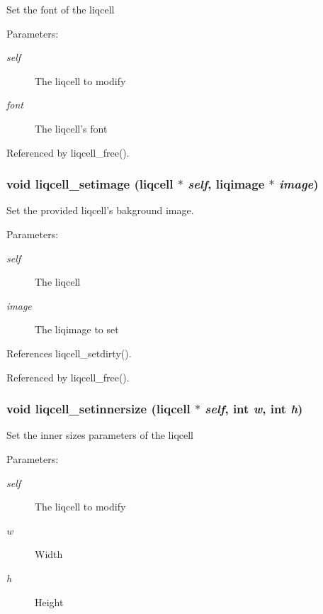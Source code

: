Set the font of the liqcell \begin{Desc}
\item[Parameters:]
\begin{description}
\item[{\em self}]The liqcell to modify \item[{\em font}]The liqcell's font \end{description}
\end{Desc}


Referenced by liqcell\_\-free().
\subsubsection[{liqcell\_\-setimage}]{\setlength{\rightskip}{0pt plus 5cm}void liqcell\_\-setimage (liqcell $\ast$ {\em self}, \/  liqimage $\ast$ {\em image})}\label{d5/da2/liqcell_8c_972de10bca2d1bd4192f4225dd04fb2c}


Set the provided liqcell's bakground image. \begin{Desc}
\item[Parameters:]
\begin{description}
\item[{\em self}]The liqcell \item[{\em image}]The liqimage to set \end{description}
\end{Desc}


References liqcell\_\-setdirty().

Referenced by liqcell\_\-free().
\subsubsection[{liqcell\_\-setinnersize}]{\setlength{\rightskip}{0pt plus 5cm}void liqcell\_\-setinnersize (liqcell $\ast$ {\em self}, \/  int {\em w}, \/  int {\em h})}\label{d5/da2/liqcell_8c_52eafc75b1cd53384992a37258bd22b4}


Set the inner sizes parameters of the liqcell \begin{Desc}
\item[Parameters:]
\begin{description}
\item[{\em self}]The liqcell to modify \item[{\em w}]Width \item[{\em h}]Height \end{description}
\end{Desc}
